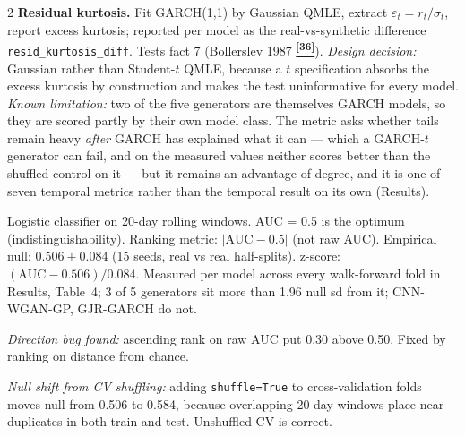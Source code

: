 \documentclass[10pt]{article}
\newcommand{\tealbox}[2]{\begin{tcolorbox}[mybox={Teal}{LBg},title={#1}]#2\end{tcolorbox}}
\newcommand{\tcite}[1]{%
  \hyperlink{R:#1}{\textsuperscript{\scriptsize\textbf{[#1]}}}}
\begin{document}
\begin{multicols}{2}
{\textbf{Residual kurtosis.} Fit GARCH(1,1) by Gaussian QMLE, extract $\varepsilon_t = r_t/\sigma_t$, report excess kurtosis; reported per model as the real-vs-synthetic difference \texttt{resid\_kurtosis\_diff}. Tests fact 7 (Bollerslev 1987\tcite{36}). \textit{Design decision:} Gaussian rather than Student-$t$ QMLE, because a $t$ specification absorbs the excess kurtosis by construction and makes the test uninformative for every model. \textit{Known limitation:} two of the five generators are themselves GARCH models, so they are scored partly by their own model class. The metric asks whether tails remain heavy \emph{after} GARCH has explained what it can --- which a GARCH-$t$ generator can fail, and on the measured values neither scores better than the shuffled control on it --- but it remains an advantage of degree, and it is one of seven temporal metrics rather than the temporal result on its own (Results).}

\tealbox{Temporal Group: Discriminative AUC}{%
Logistic classifier on 20-day rolling windows. AUC = 0.5 is the optimum (indistinguishability). Ranking metric: $|\text{AUC} - 0.5|$ (not raw AUC). Empirical null: $0.506 \pm 0.084$ (15 seeds, real vs real half-splits). z-score: $(\text{AUC} - 0.506)/0.084$. Measured per model across every walk-forward fold in Results, Table~4; 3 of 5 generators sit more than 1.96 null sd from it; CNN-WGAN-GP, GJR-GARCH do not.

\textit{Direction bug found:} ascending rank on raw AUC put 0.30 above 0.50. Fixed by ranking on distance from chance.

\textit{Null shift from CV shuffling:} adding \texttt{shuffle=True} to cross-validation folds moves null from 0.506 to 0.584, because overlapping 20-day windows place near-duplicates in both train and test. Unshuffled CV is correct.}

\end{multicols}
\end{document}
